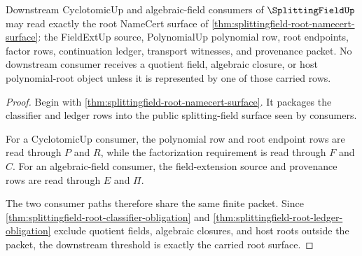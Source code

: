 \begin{theorem}
\label{thm:splittingfield-root-downstream-threshold}
Downstream CyclotomicUp and algebraic-field consumers of
$\SplittingFieldUp$ may read exactly the root NameCert surface of
\autoref{thm:splittingfield-root-namecert-surface}: the FieldExtUp source,
PolynomialUp polynomial row, root endpoints, factor rows, continuation
ledger, transport witnesses, and provenance packet. No downstream consumer
receives a quotient field, algebraic closure, or host polynomial-root object
unless it is represented by one of those carried rows.
\end{theorem}
\begin{proof}
Begin with \autoref{thm:splittingfield-root-namecert-surface}. It packages
the classifier and ledger rows into the public splitting-field surface seen
by consumers.

For a CyclotomicUp consumer, the polynomial row and root endpoint rows are
read through $P$ and $R$, while the factorization requirement is read through
$F$ and $C$. For an algebraic-field consumer, the field-extension source and
provenance rows are read through $E$ and $\Pi$.

The two consumer paths therefore share the same finite packet. Since
\autoref{thm:splittingfield-root-classifier-obligation} and
\autoref{thm:splittingfield-root-ledger-obligation} exclude quotient fields,
algebraic closures, and host roots outside the packet, the downstream
threshold is exactly the carried root surface.
\end{proof}

